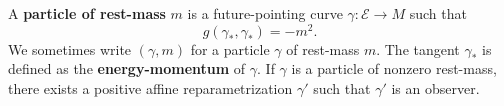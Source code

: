 A \textbf{particle of rest-mass} $m$ is a future-pointing curve $\gamma: \mathcal{E} \rightarrow M$ such that
$$g(\gamma_*, \gamma_*) = -m^2.$$
We sometimes write $(\gamma, m)$ for a particle $\gamma$ of rest-mass $m$. The tangent $\gamma_*$ is defined as the \textbf{energy-momentum} of $\gamma$. If $\gamma$ is a particle of nonzero rest-mass, there exists a positive affine reparametrization $\gamma'$ such that $\gamma'$ is an observer.
